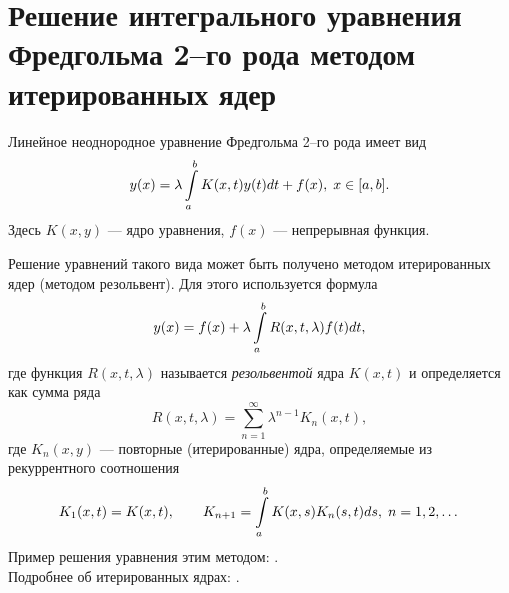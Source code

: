 \section{Решение интегрального уравнения Фредгольма 2--го рода методом итерированных ядер}
\label{sec:q-33}
Линейное неоднородное уравнение Фредгольма 2--го рода имеет вид
$$y(x) = \lambda \int\displaylimits_{a}^{b}K(x, t) y(t) dt + f(x), \; x \in [a, b].$$
Здесь $K(x, y)$ --- ядро уравнения, $f(x)$ --- непрерывная функция.

Решение уравнений такого вида может быть получено методом итерированных ядер (методом резольвент). Для этого используется формула
$$y(x) = f(x) + \lambda \int\displaylimits_{a}^{b} R(x, t, \lambda)f(t)dt,$$
где функция $R(x, t, \lambda)$ называется \textit{резольвентой} ядра $K(x, t)$ и определяется как сумма ряда
$$R(x, t, \lambda) = \sum_{n = 1}^{\infty} \lambda^{n - 1}K_n(x, t),$$
где $K_n(x, y)$ --- повторные (итерированные) ядра, определяемые из рекуррентного соотношения
$$K_1(x, t) = K(x, t), \qquad K_{n + 1} = \int\displaylimits_{a}^{b} K(x, s)K_n(s, t)ds, \; n = 1, 2, \dots $$
Пример решения уравнения этим методом: \cite[с.~34]{int-diff-equations}.\\
Подробнее об итерированных ядрах: \cite{iter-kernels}.